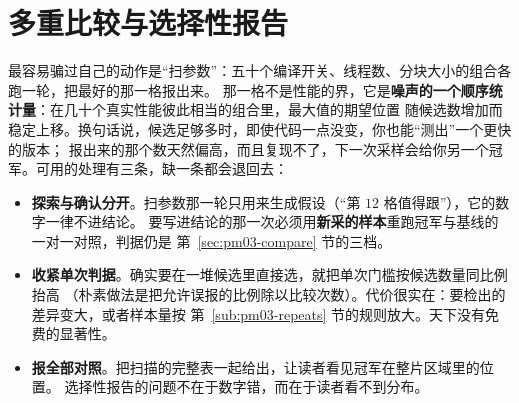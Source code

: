 \documentclass[12pt,a4paper,fontset=fandol]{ctexbook}
\begin{document}
\section{多重比较与选择性报告}
\label{sec:pm03-multiplicity}

最容易骗过自己的动作是``扫参数''：五十个编译开关、线程数、分块大小的组合各跑一轮，把最好的那一格报出来。
那一格不是性能的界，它是\textbf{噪声的一个顺序统计量}：在几十个真实性能彼此相当的组合里，最大值的期望位置
随候选数增加而稳定上移。换句话说，候选足够多时，即使代码一点没变，你也能``测出''一个更快的版本；
报出来的那个数天然偏高，而且复现不了，下一次采样会给你另一个冠军。可用的处理有三条，缺一条都会退回去：

\begin{itemize}
  \item \textbf{探索与确认分开}。扫参数那一轮只用来生成假设（``第 $12$ 格值得跟''），它的数字一律不进结论。
        要写进结论的那一次必须用\textbf{新采的样本}重跑冠军与基线的一对一对照，判据仍是
        第~\ref{sec:pm03-compare} 节的三档。
  \item \textbf{收紧单次判据}。确实要在一堆候选里直接选，就把单次门槛按候选数量同比例抬高
        （朴素做法是把允许误报的比例除以比较次数）。代价很实在：要检出的差异变大，或者样本量按
        第~\ref{sub:pm03-repeats} 节的规则放大。天下没有免费的显著性。
  \item \textbf{报全部对照}。把扫描的完整表一起给出，让读者看见冠军在整片区域里的位置。
        选择性报告的问题不在于数字错，而在于读者看不到分布。
\end{itemize}
\end{document}
